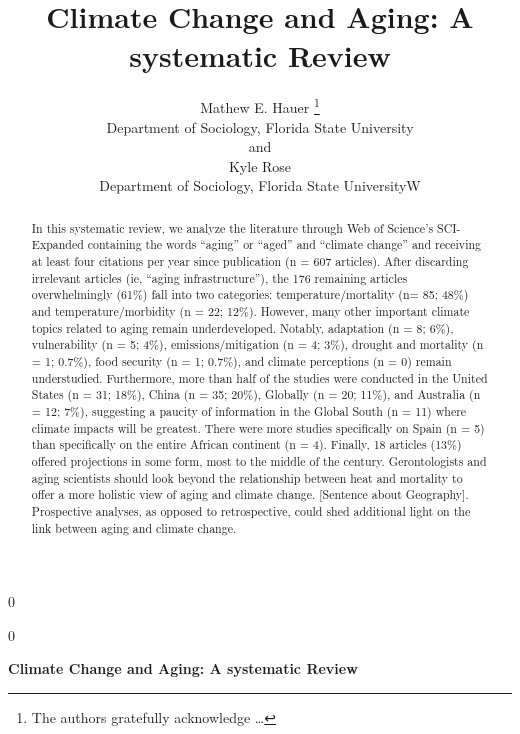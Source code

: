 \documentclass[12pt]{article}
\newcommand{\blind}{0}
\begin{document}
\def\spacingset#1{\renewcommand{\baselinestretch}%
{#1}\small\normalsize} \spacingset{1}



\blind
{
  \title{\bf Climate Change and Aging: A systematic Review}

  \author{
        Mathew E. Hauer \thanks{The authors gratefully acknowledge
\ldots{}} \\
    Department of Sociology, Florida State University\\
     and \\     Kyle Rose \\
    Department of Sociology, Florida State UniversityW\\
      }
  \maketitle
} \fi

\blind
{
  \bigskip
  \bigskip
  \bigskip
  \begin{center}
    {\LARGE\bf Climate Change and Aging: A systematic Review}
  \end{center}
  \medskip
} \fi

\bigskip
\begin{abstract}
In this systematic review, we analyze the literature through Web of
Science's SCI-Expanded containing the words ``aging'' or ``aged'' and
``climate change'' and receiving at least four citations per year since
publication (n = 607 articles). After discarding irrelevant articles
(ie, ``aging infrastructure''), the 176 remaining articles
overwhelmingly (61\%) fall into two categories: temperature/mortality
(n= 85; 48\%) and temperature/morbidity (n = 22; 12\%). However, many
other important climate topics related to aging remain underdeveloped.
Notably, adaptation (n = 8; 6\%), vulnerability (n = 5; 4\%),
emissions/mitigation (n = 4; 3\%), drought and mortality (n = 1; 0.7\%),
food security (n = 1; 0.7\%), and climate perceptions (n = 0) remain
understudied. Furthermore, more than half of the studies were conducted
in the United States (n = 31; 18\%), China (n = 35; 20\%), Globally (n =
20; 11\%), and Australia (n = 12; 7\%), suggesting a paucity of
information in the Global South (n = 11) where climate impacts will be
greatest. There were more studies specifically on Spain (n = 5) than
specifically on the entire African continent (n = 4). Finally, 18
articles (13\%) offered projections in some form, most to the middle of
the century. Gerontologists and aging scientists should look beyond the
relationship between heat and mortality to offer a more holistic view of
aging and climate change. {[}Sentence about Geography{]}. Prospective
analyses, as opposed to retrospective, could shed additional light on
the link between aging and climate change.
\end{abstract}
\end{document}
